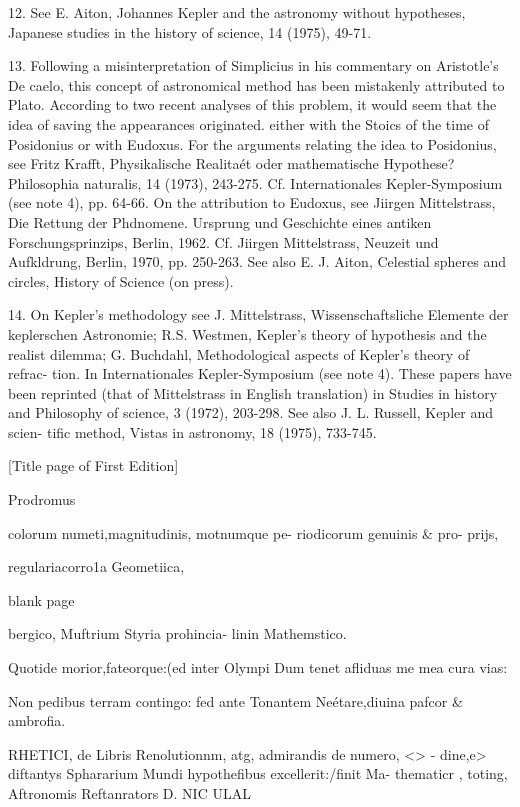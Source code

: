 \documentclass{article}
\begin{document}
12. See E. Aiton, Johannes Kepler and the astronomy without hypotheses,
Japanese studies in the history of science, 14 (1975), 49-71.

13. Following a misinterpretation of Simplicius in his commentary on Aristotle’s
De caelo, this concept of astronomical method has been mistakenly attributed to
Plato. According to two recent analyses of this problem, it would seem that the idea
of saving the appearances originated. either with the Stoics of the time of
Posidonius or with Eudoxus. For the arguments relating the idea to Posidonius, see
Fritz Krafft, Physikalische Realitaét oder mathematische Hypothese? Philosophia
naturalis, 14 (1973), 243-275. Cf. Internationales Kepler-Symposium (see note 4),
pp. 64-66. On the attribution to Eudoxus, see Jiirgen Mittelstrass, Die Rettung der
Phdnomene. Ursprung und Geschichte eines antiken Forschungsprinzips, Berlin,
1962. Cf. Jiirgen Mittelstrass, Neuzeit und Aufkldrung, Berlin, 1970, pp. 250-263.
See also E. J. Aiton, Celestial spheres and circles, History of Science (on press).

14. On Kepler’s methodology see J. Mittelstrass, Wissenschaftsliche Elemente
der keplerschen Astronomie; R.S. Westmen, Kepler’s theory of hypothesis and the
realist dilemma; G. Buchdahl, Methodological aspects of Kepler’s theory of refrac-
tion. In Internationales Kepler-Symposium (see note 4). These papers have been
reprinted (that of Mittelstrass in English translation) in Studies in history and
Philosophy of science, 3 (1972), 203-298. See also J. L. Russell, Kepler and scien-
tific method, Vistas in astronomy, 18 (1975), 733-745.

[Title page of First Edition]

Prodromus




colorum numeti,magnitudinis, motnumque pe-
riodicorum genuinis & pro-
prijs,

regulariacorro1a Geometiica,

blank page


bergico, Muftrium Styria prohincia-
linin Mathemstico.

Quotide morior,fateorque:(ed inter Olympi
Dum tenet afliduas me mea cura vias:

Non pedibus terram contingo: fed ante Tonantem
Neétare,diuina pafcor & ambrofia.

RHETICI, de Libris Renolutionnm, atg, admirandis de numero, <> -
dine,e> diftantys Sphararium Mundi hypothefibus excellerit:/finit Ma-
thematicr , toting, Aftronomis Reftanrators D. NIC ULAL
\end{document}
